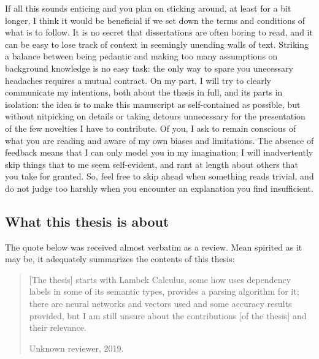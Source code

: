 If all this sounds enticing and you plan on sticking around, at least for a bit longer, I think it would be beneficial if we set down the terms and conditions of what is to follow. 
It is no secret that dissertations are often boring to read, and it can be easy to lose track of context in seemingly unending walls of text. 
Striking a balance between being pedantic and making too many assumptions on background knowledge is no easy task: the only way to spare you unecessary headaches requires a mutual contract. 
On my part, I will try to clearly communicate my intentions, both about the thesis in full, and its parts in isolation: the idea is to make this manuscript as self-contained as possible, but without nitpicking on details or taking detours unnecessary for the presentation of the few novelties I have to contribute.
Of you, I ask to remain conscious of what you are reading and aware of my own biases and limitations. 
The absence of feedback means that I can only model you in my imagination; 
I will inadvertently skip things that to me seem self-evident, and rant at length about others that you take for granted.
So, feel free to skip ahead when something reads trivial, and do not judge too harshly when you encounter an explanation you find insufficient.

\newpage

\subsection*{What this thesis is about}
The quote below was received almost verbatim as a review.
Mean spirited as it may be, it adequately summarizes the contents of this thesis:
\begin{quote}
[The thesis] starts with Lambek Calculus, some how uses dependency labels in some of its semantic types, provides a parsing algorithm for it; there are neural networks and vectors used and some accuracy results provided, but I am still unsure about the contributions [of the thesis] and their relevance.
\begin{flushright} Unknown reviewer, 2019.\end{flushright}
\end{quote}

